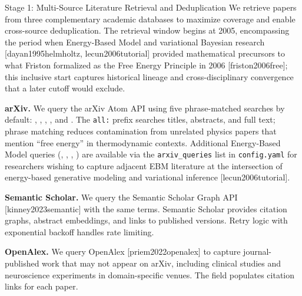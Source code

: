 \documentclass[
  ignorenonframetext,
]{beamer}
\author{\texorpdfstring{}{}}
\date{}
\providecommand{\citep}[1]{[#1]}
\begin{document}
\begin{frame}{Stage 1: Multi-Source Literature
Retrieval and Deduplication \label{sec:methods_retrieval}}
\protect{}\label{stage-1-multi-source-literature-retrieval-and-deduplication}
We retrieve papers from three complementary academic databases to
maximize coverage and enable cross-source deduplication. The retrieval
window begins at 2005, encompassing the period when Energy-Based Model
and variational Bayesian research
\citep{dayan1995helmholtz, lecun2006tutorial} provided mathematical
precursors to what Friston formalized as the Free Energy Principle in
2006 \citep{friston2006free}; this inclusive start captures historical
lineage and cross-disciplinary convergence that a later cutoff would
exclude.

\textbf{arXiv.} We query the arXiv Atom API using five phrase-matched
searches by default: ,
,
,
, and
. The
\texttt{all:} prefix searches titles, abstracts, and full text; phrase
matching reduces contamination from unrelated physics papers that
mention ``free energy'' in thermodynamic contexts. Additional
Energy-Based Model queries
(,
,
,
)
are available via the \texttt{arxiv\_queries} list in
\texttt{config.yaml} for researchers wishing to capture adjacent EBM
literature at the intersection of energy-based generative modeling and
variational inference \citep{lecun2006tutorial}.

\textbf{Semantic Scholar.} We query the Semantic Scholar Graph API
\citep{kinney2023semantic} with the same terms. Semantic Scholar
provides citation graphs, abstract embeddings, and links to published
versions. Retry logic with exponential backoff handles rate limiting.

\textbf{OpenAlex.} We query OpenAlex \citep{priem2022openalex} to
capture journal-published work that may not appear on arXiv, including
clinical studies and neuroscience experiments in domain-specific venues.
The  field populates citation links for each
paper.


\end{frame}
\end{document}

